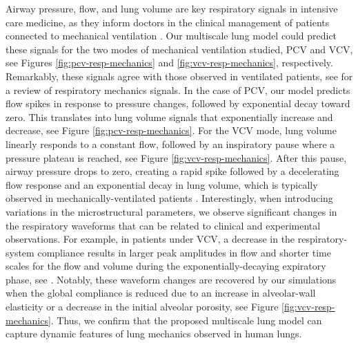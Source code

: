 \documentclass[preprint,3p,12pt,number,sort&compress]{elsarticle}
\begin{document}
Airway pressure, flow, and lung volume are key respiratory signals in intensive care medicine, as they inform doctors in the clinical management of patients connected to mechanical ventilation \cite{Hess2014}. Our multiscale lung model could predict these signals for the two modes of mechanical ventilation studied, PCV and VCV, see Figures \ref{fig:pcv-resp-mechanics} and \ref{fig:vcv-resp-mechanics}, respectively. Remarkably, these signals agree with those observed in ventilated patients, see \cite{LucangeloEtal2005} for a review of respiratory mechanics signals. In the case of PCV, our model predicts flow spikes in response to pressure changes, followed by exponential decay toward zero. This translates into lung volume signals that exponentially increase and decrease, see Figure \ref{fig:pcv-resp-mechanics}. For the VCV mode, lung volume linearly responds to a constant flow, followed by an inspiratory pause where a pressure plateau is reached, see Figure \ref{fig:vcv-resp-mechanics}. After this pause, airway pressure drops to zero, creating a rapid spike followed by a decelerating flow response and an exponential decay in lung volume, which is typically observed in mechanically-ventilated patients \cite{ball2015modes}. Interestingly, when introducing variations in the microstructural parameters, we observe significant changes in the respiratory waveforms that can be related to clinical and experimental observations. For example, in patients under VCV, a decrease in the respiratory-system compliance results in larger peak amplitudes in flow and shorter time scales for the flow and volume during the exponentially-decaying expiratory phase, see \cite{LucangeloEtal2005}. Notably, these waveform changes are recovered by our simulations when the global compliance is reduced due to an increase in alveolar-wall elasticity or a decrease in the initial alveolar porosity, see Figure \ref{fig:vcv-resp-mechanics}. Thus, we confirm that the proposed multiscale lung model can capture dynamic features of lung mechanics observed in human lungs.\\  
\end{document}
